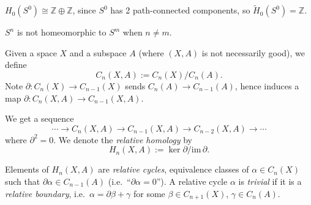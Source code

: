 \documentclass[12pt]{amsart}
\begin{document}
\begin{example}
    ${H}_0(S^0) \cong \mathbb{Z} \oplus \mathbb{Z}$, since $S^0$ has 2 path-connected components, so $\widetilde{H}_0(S^0) = \mathbb{Z}$.
\end{example}

\begin{corollary}
    $S^n$ is not homeomorphic to $S^m$ when $n \neq m$.
\end{corollary}


\begin{definition}
    Given a space $X$ and a subspace $A$ (where $(X,A)$ is not necessarily good), we define
    \[
        C_n(X, A) := C_n(X) / C_n(A).
    \]
    Note $\partial: C_n(X) \to C_{n-1}(X)$ sends $C_n(A) \to C_{n-1}(A)$, hence induces a map $\partial: C_n(X,A) \to C_{n-1}(X,A)$.

    We get a sequence
    \[
        \cdots \to C_n(X,A) \to C_{n-1}(X,A) \to C_{n-2}(X,A) \to \cdots
    \]
    where $\partial^2 = 0$. We denote the \emph{relative homology} by
    \[
        H_n(X,A) := \ker \partial / \mathrm{im}\, \partial.
    \]

    Elements of $H_n(X,A)$ are \emph{relative cycles}, equivalence classes of $\alpha \in C_n(X)$ such that $\partial \alpha \in C_{n-1}(A)$ (i.e.\ ``$\partial \alpha = 0$''). A relative cycle $\alpha$ is \emph{trivial} if it is a \emph{relative boundary}, i.e.\ $\alpha = \partial\beta + \gamma$ for some $\beta \in C_{n+1}(X)$, $\gamma \in C_n(A)$.
\end{definition}

\end{document}
